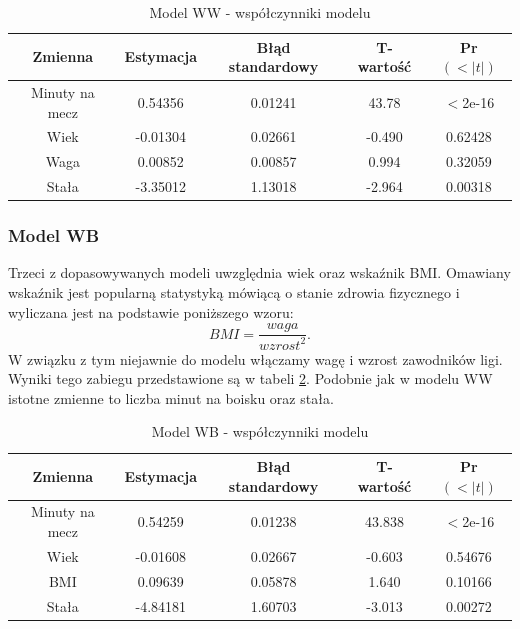 \documentclass[11pt,a4paper]{article}
\begin{document}
\begin{table}[H]
	\begin{tabular}{| c | c | c | c | c |}
		\hline
		Zmienna & Estymacja & Błąd standardowy & T-wartość & Pr$(<|t|)$\\ \hline
		Minuty na mecz & 0.54356 & 0.01241 & 43.78 & $<$2e-16\\ \hline
		Wiek & -0.01304 & 0.02661 & -0.490 & 0.62428 \\ \hline 
		Waga & 0.00852 & 0.00857 & 0.994 & 0.32059\\ \hline
		Stała & -3.35012 & 1.13018 & -2.964 & 0.00318\\ \hline
	\end{tabular}
	\caption{Model WW - współczynniki modelu}
	\label{model_ww}
\end{table}

\subsubsection{Model WB}
Trzeci z dopasowywanych modeli uwzględnia wiek oraz wskaźnik BMI. Omawiany wskaźnik jest popularną statystyką mówiącą o stanie zdrowia fizycznego i wyliczana jest na podstawie poniższego wzoru:
\begin{equation}
BMI = \frac{waga}{wzrost^2}.
\end{equation}
W związku z tym niejawnie do modelu włączamy wagę i wzrost zawodników ligi. Wyniki tego zabiegu przedstawione są w tabeli \ref{model_wb}. Podobnie jak w modelu WW istotne zmienne to liczba minut na boisku oraz stała. 
\begin{table}[H]
	\begin{tabular}{| c | c | c | c | c |}
		\hline
		Zmienna & Estymacja & Błąd standardowy & T-wartość & Pr$(<|t|)$\\ \hline
		Minuty na mecz & 0.54259 & 0.01238 & 43.838 & $<$2e-16\\ \hline
		Wiek & -0.01608 & 0.02667 & -0.603 & 0.54676\\ \hline 
		BMI & 0.09639 & 0.05878 & 1.640 & 0.10166\\ \hline  
		Stała & -4.84181 & 1.60703 & -3.013 & 0.00272\\ \hline	
	\end{tabular}
	\caption{Model WB - współczynniki modelu}
	\label{model_wb}
\end{table}
\end{document}
